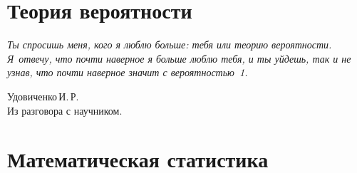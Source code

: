\documentclass[12pt]{article}
\numberwithin{Th}{section}
\numberwithin{Def}{section}
\numberwithin{Lem}{section}
\numberwithin{St}{section}
\numberwithin{equation}{section}
\begin{document}
\tableofcontents
\newpage

\part{Теория вероятности}

\hfill\parbox{0.5\linewidth}{
\textit{Ты спросишь меня, кого я люблю больше: тебя или теорию вероятности. Я~отвечу, что почти наверное я больше люблю тебя, и ты уйдешь, так и не узнав, что почти наверное значит с вероятностью~1.}
\begin{flushright}
    Удовиченко\,И.\,Р. \\
    Из разговора с научником.
\end{flushright} 
}
\newpage








































\part{Математическая статистика}
\end{document}
